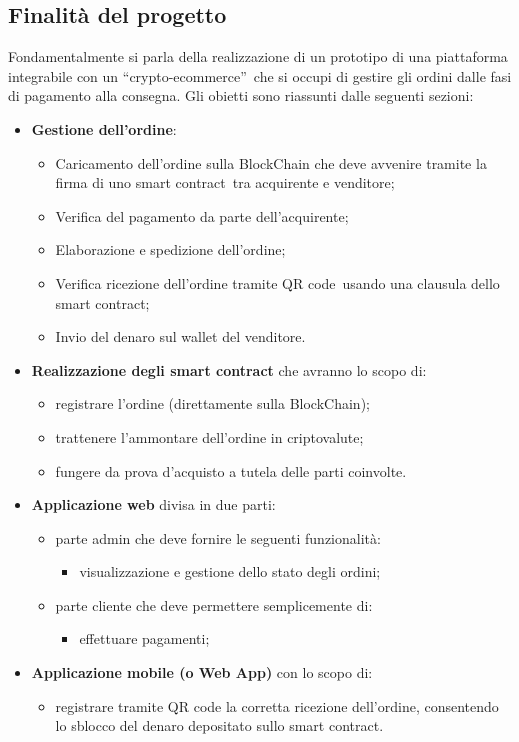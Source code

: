 \subsection{Finalità del progetto}
Fondamentalmente si parla della realizzazione di un prototipo di una piattaforma integrabile con un “crypto-ecommerce”\glo\, che si occupi di gestire gli ordini dalle fasi di pagamento alla consegna.
\newline
Gli obietti sono riassunti dalle seguenti sezioni:
\begin{itemize}
	\item \textbf{Gestione dell'ordine}:
		\begin{itemize}
			\item Caricamento dell'ordine sulla BlockChain che deve avvenire tramite la firma di uno {smart contract}\glo\ tra acquirente e venditore;
			\item Verifica del pagamento da parte dell'acquirente;
			\item Elaborazione e spedizione dell'ordine;
			\item Verifica ricezione dell'ordine tramite QR code\glo\ usando una clausula dello smart contract;
			\item Invio del denaro sul wallet del venditore.
		\end{itemize}
	\item \textbf{Realizzazione degli smart contract} che avranno lo scopo di:
		\begin{itemize}
			\item registrare l'ordine (direttamente sulla BlockChain);
			\item trattenere l'ammontare dell'ordine in criptovalute;
			\item fungere da prova d'acquisto a tutela delle parti coinvolte.
		\end{itemize}
	\item \textbf{Applicazione web} divisa in due parti:
		\begin{itemize}
			\item parte admin che deve fornire le seguenti funzionalità:
			\begin{itemize}
				\item visualizzazione e gestione dello stato degli ordini;
			\end{itemize}
			\item parte cliente che deve permettere semplicemente di:
			\begin{itemize}
				\item effettuare pagamenti;
			\end{itemize}
		\end{itemize}
	\item \textbf{Applicazione mobile (o Web App)} con lo scopo di:
		\begin{itemize}
			\item registrare tramite QR code la corretta ricezione dell'ordine, consentendo lo sblocco del denaro depositato sullo smart contract.
		\end{itemize}
\end{itemize}


